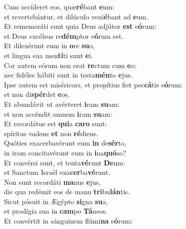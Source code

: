 \evenverse Cum occíderet eos, quæ\textbf{ré}bant \textbf{e}um:~\*\\
\evenverse et revertebántur, et dilúculo veni\textbf{é}bant ad \textbf{e}um.\\
\oddverse Et rememoráti sunt quia Deus adjútor \textbf{est} e\textbf{ó}rum:~\*\\
\oddverse et Deus excélsus re\textbf{dém}ptor e\textbf{ó}rum est.\\
\evenverse Et dilexérunt eum in \textbf{o}re \textbf{su}o,~\*\\
\evenverse et lingua sua men\textbf{tí}ti sunt \textbf{e}i.\\
\oddverse Cor autem eórum non erat \textbf{re}ctum cum \textbf{e}o:~\*\\
\oddverse nec fidéles hábiti sunt in testa\textbf{mén}to \textbf{e}jus.\\
\evenverse Ipse autem est miséricors, et propítius fiet pec\textbf{cá}tis e\textbf{ó}rum:~\*\\
\evenverse et non di\textbf{spér}det \textbf{e}os.\\
\oddverse Et abundávit ut avérteret \textbf{i}ram \textbf{su}am:~\*\\
\oddverse et non accéndit omnem \textbf{i}ram \textbf{su}am:\\
\evenverse Et recordátus est \textbf{qui}a \textbf{ca}\textbf{ro} sunt:~\*\\
\evenverse spíritus vadens \textbf{et} non \textbf{ré}diens.\\
\oddverse Quóties exacerbavérunt eum \textbf{in} de\textbf{sér}to,~\*\\
\oddverse in iram concitavérunt eum in \textbf{i}na\textbf{quó}so?\\
\evenverse Et convérsi sunt, et tenta\textbf{vé}runt \textbf{De}um:~\*\\
\evenverse et Sanctum Israël exa\textbf{cer}ba\textbf{vé}runt.\\
\oddverse Non sunt recordáti \textbf{ma}nus \textbf{e}jus,~\*\\
\oddverse die qua redémit eos de manu \textbf{tri}bu\textbf{lán}tis.\\
\evenverse Sicut pósuit in Ægýpto \textbf{si}gna \textbf{su}a,~\*\\
\evenverse et prodígia sua in \textbf{cam}po \textbf{Tá}neos.\\
\oddverse Et convértit in sánguinem flúmi\textbf{na} e\textbf{ó}rum:~\*\\
